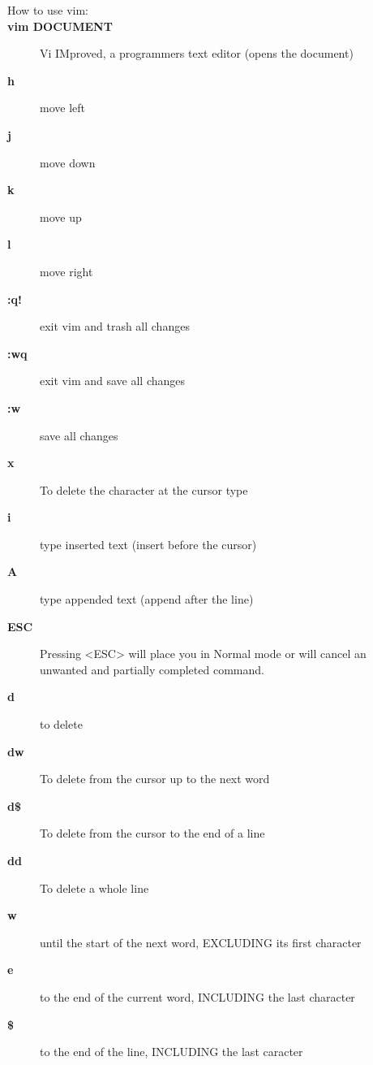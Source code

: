 \documentclass[10pt,a4paper]{scrartcl}
\begin{document}
\begin{description}
\item[\large{How to use vim:}]



\item[\bf{vim DOCUMENT}] Vi IMproved, a programmers text editor (opens the document)

\item[\bf{h}] move left

\item[\bf{j}] move down

\item[\bf{k}] move up

\item[\bf{l}] move right

\item[\bf{:q!}] exit vim and trash all changes

\item[\bf{:wq}] exit vim and save all changes

\item[\bf{:w}] save all changes

\item[\bf{x}] To delete the character at the cursor type

\item[\bf{i}] type inserted text (insert before the cursor)

\item[\bf{A}] type appended text (append after the line)

\item[\bf{ESC}]  Pressing <ESC> will place you in Normal mode or will cancel
      an unwanted and partially completed command.

\item[\bf{d}] to delete

\item[\bf{dw}] To delete from the cursor up to the next word

\item[\bf{d\$}] To delete from the cursor to the end of a line

\item[\bf{dd}] To delete a whole line

\item[\bf{w}] until the start of the next word, EXCLUDING its first character

\item[\bf{e}] to the end of the current word, INCLUDING the last character

\item[\bf{\$}] to the end of the line, INCLUDING the last caracter


\end{description}
\end{document}
